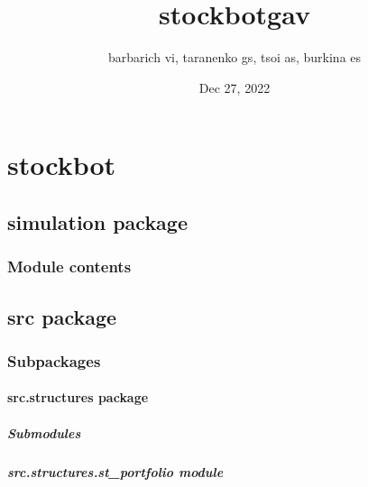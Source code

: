 \documentclass[letterpaper,10pt,english,openany,oneside]{sphinxmanual}
\title{stock\sphinxhyphen{}bot\sphinxhyphen{}gav}
\date{Dec 27, 2022}
\author{barbarich vi, taranenko gs, tsoi as, burkina es}
\begin{document}
\pagestyle{empty}
\sphinxmaketitle
\pagestyle{plain}
\sphinxtableofcontents
\pagestyle{normal}
\label{\detokenize{index::doc}}


\sphinxstepscope


\chapter{stock\sphinxhyphen{}bot}
\label{\detokenize{modules:stock-bot}}\label{\detokenize{modules::doc}}
\sphinxstepscope


\section{simulation package}
\label{\detokenize{simulation:simulation-package}}\label{\detokenize{simulation::doc}}

\subsection{Module contents}
\label{\detokenize{simulation:module-simulation}}\label{\detokenize{simulation:module-contents}}
\sphinxstepscope


\section{src package}
\label{\detokenize{src:src-package}}\label{\detokenize{src::doc}}

\subsection{Subpackages}
\label{\detokenize{src:subpackages}}
\sphinxstepscope


\subsubsection{src.structures package}
\label{\detokenize{src.structures:src-structures-package}}\label{\detokenize{src.structures::doc}}

\paragraph{Submodules}
\label{\detokenize{src.structures:submodules}}

\paragraph{src.structures.st\_portfolio module}
\label{\detokenize{src.structures:module-src.structures.st_portfolio}}\label{\detokenize{src.structures:src-structures-st-portfolio-module}}
\end{document}
